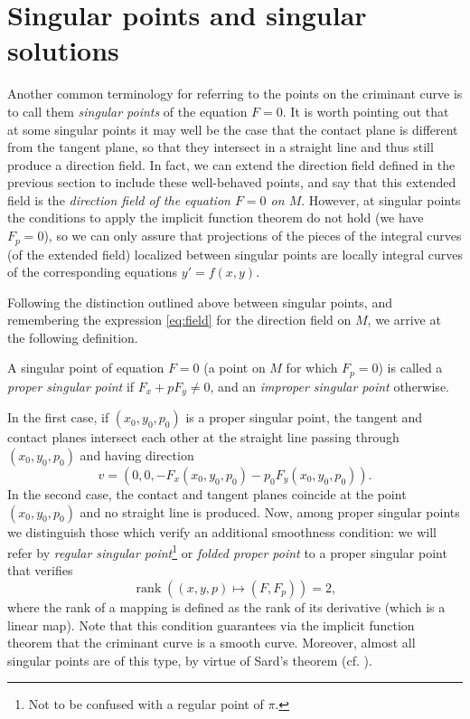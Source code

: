 \section{Singular points and singular solutions}

Another common terminology for referring to the points on the criminant curve is to call them \textit{singular points} of the equation $F=0$. It is worth pointing out that at some singular points it may well be the case that the contact plane is different from the tangent plane, so that they intersect in a straight line and thus still produce a direction field. In fact, we can extend the direction field defined in the previous section to include these well-behaved points, and say that this extended field is the \textit{direction field of the equation $F=0$ on $M$}. However, at singular points the conditions to apply the implicit function theorem do not hold (we have $F_p=0$), so we can only assure that projections of the pieces of the integral curves (of the extended field) localized between singular points are locally integral curves of the corresponding equations $y'=f(x,y)$.

Following the distinction outlined above between singular points, and remembering the expression \eqref{eq:field} for the direction field on $M$, we arrive at the following definition.

\begin{definition}
  A singular point of equation $F=0$ (a point on $M$ for which $F_p=0$) is called a \textit{proper singular point} if $F_x+pF_y \neq 0$, and an \textit{improper singular point} otherwise.
\end{definition}
In the first case, if $(x_0,y_0,p_0)$ is a proper singular point, the tangent and contact planes intersect each other at the straight line passing through $(x_0,y_0,p_0)$ and having direction
\[
v=(0,0,-F_x(x_0,y_0,p_0)-p_0F_y(x_0,y_0,p_0)).
\]
In the second case, the contact and tangent planes coincide at the point $(x_0,y_0,p_0)$ and no straight line is produced. Now, among proper singular points we distinguish those which verify an additional smoothness condition: we will refer by \textit{regular singular point}\footnote{Not to be confused with a regular point of $\pi$.} or \textit{folded proper point} to a proper singular point that verifies
\[
\operatorname{rank}((x,y,p) \mapsto (F,F_p)) = 2,
\]
where the rank of a mapping is defined as the rank of its derivative (which is a linear map). Note that this condition guarantees via the implicit function theorem that the criminant curve is a smooth curve. Moreover, almost all singular points are of this type, by virtue of Sard's theorem (cf. \cite[94]{arnold2012geometrical}).

